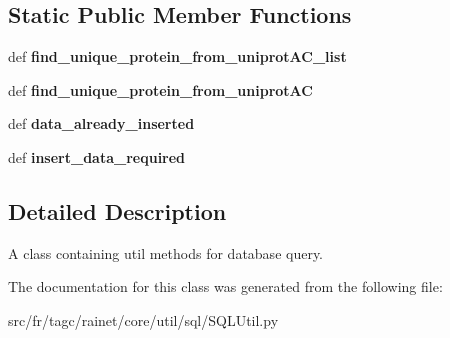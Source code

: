 \subsection*{Static Public Member Functions}
\begin{DoxyCompactItemize}
\item 
\hypertarget{classsrc_1_1fr_1_1tagc_1_1rainet_1_1core_1_1util_1_1sql_1_1SQLUtil_1_1SQLUtil_a8550a7405093fe1086e2c9ec24e06224}{def {\bfseries find\-\_\-unique\-\_\-protein\-\_\-from\-\_\-uniprot\-A\-C\-\_\-list}}\label{classsrc_1_1fr_1_1tagc_1_1rainet_1_1core_1_1util_1_1sql_1_1SQLUtil_1_1SQLUtil_a8550a7405093fe1086e2c9ec24e06224}

\item 
\hypertarget{classsrc_1_1fr_1_1tagc_1_1rainet_1_1core_1_1util_1_1sql_1_1SQLUtil_1_1SQLUtil_a69b47b4ecd8f5da57db50aa1bf25829c}{def {\bfseries find\-\_\-unique\-\_\-protein\-\_\-from\-\_\-uniprot\-A\-C}}\label{classsrc_1_1fr_1_1tagc_1_1rainet_1_1core_1_1util_1_1sql_1_1SQLUtil_1_1SQLUtil_a69b47b4ecd8f5da57db50aa1bf25829c}

\item 
\hypertarget{classsrc_1_1fr_1_1tagc_1_1rainet_1_1core_1_1util_1_1sql_1_1SQLUtil_1_1SQLUtil_a8237ec5950a8c95414be2faaaf294d45}{def {\bfseries data\-\_\-already\-\_\-inserted}}\label{classsrc_1_1fr_1_1tagc_1_1rainet_1_1core_1_1util_1_1sql_1_1SQLUtil_1_1SQLUtil_a8237ec5950a8c95414be2faaaf294d45}

\item 
\hypertarget{classsrc_1_1fr_1_1tagc_1_1rainet_1_1core_1_1util_1_1sql_1_1SQLUtil_1_1SQLUtil_a56af2ea8d34079a2510a2618538e073e}{def {\bfseries insert\-\_\-data\-\_\-required}}\label{classsrc_1_1fr_1_1tagc_1_1rainet_1_1core_1_1util_1_1sql_1_1SQLUtil_1_1SQLUtil_a56af2ea8d34079a2510a2618538e073e}

\end{DoxyCompactItemize}


\subsection{Detailed Description}
A class containing util methods for database query. 

The documentation for this class was generated from the following file\-:\begin{DoxyCompactItemize}
\item 
src/fr/tagc/rainet/core/util/sql/S\-Q\-L\-Util.\-py\end{DoxyCompactItemize}
